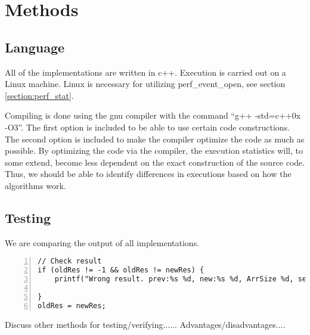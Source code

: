 
\chapter{Methods} %

\label{Chapter0} %


\section{Language}
All of the implementations are written in c++. Execution is carried out on a
Linux machine. Linux is necessary for utilizing perf\_event\_open, see section
\ref{section:perf_stat}.

Compiling is done using the gnu compiler with the command ``g++ -std=c++0x
-O3''.
The first option is included to be able to use certain code constructions.
The second option is included to make the compiler optimize the code as much as
possible.
By optimizing the code via the compiler, the execution statistics will, to some
extend, become less dependent on the exact construction of the source code.
Thus, we should be able to identify differences in executions based on how the
algorithms work.




\section{Testing}
We are comparing the output of all implementations.
 \begin{lstlisting}[numbers=left]
 // Check result
if (oldRes != -1 && oldRes != newRes) {
	printf("Wrong result. prev:%s %d, new:%s %d, ArrSize %d, searchFor %d\n", algo_labels[iAlg-1], oldRes, algo_labels[iAlg], newRes, arrSize, searchFor); 
 					
}
oldRes = newRes;
\end{lstlisting}
Discuss other methods for testing/verifying...... Advantages/disadvantages....


